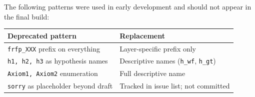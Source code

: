 The following patterns were used in early development and should not appear in
the final build:

\begin{center}
\begin{tabular}{ll}
\toprule
Deprecated pattern & Replacement \\
\midrule
\texttt{frfp\_XXX} prefix on everything & Layer-specific prefix only \\
\texttt{h1, h2, h3} as hypothesis names & Descriptive names (\texttt{h\_wf}, \texttt{h\_gt}) \\
\texttt{Axiom1, Axiom2} enumeration & Full descriptive name \\
\texttt{sorry} as placeholder beyond draft & Tracked in issue list; not committed \\
\bottomrule
\end{tabular}
\end{center}
